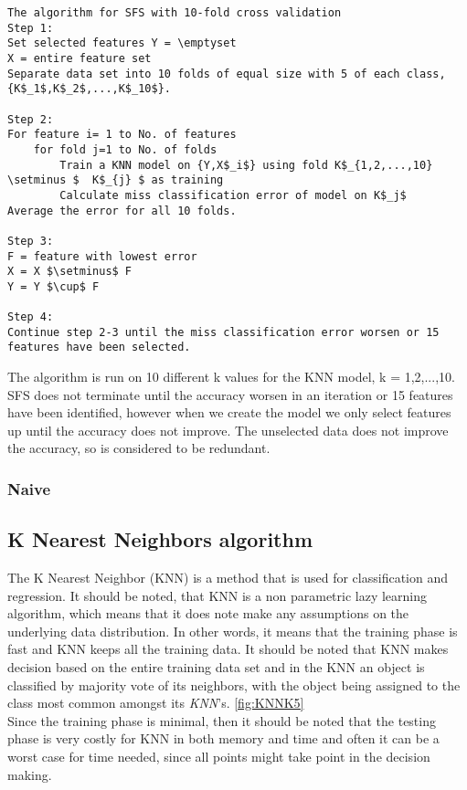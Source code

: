 \begin{lstlisting}[mathescape=true]
The algorithm for SFS with 10-fold cross validation
Step 1:
Set selected features Y = \emptyset
X = entire feature set
Separate data set into 10 folds of equal size with 5 of each class, {K$_1$,K$_2$,...,K$_10$}.

Step 2:
For feature i= 1 to No. of features
	for fold j=1 to No. of folds
		Train a KNN model on {Y,X$_i$} using fold K$_{1,2,...,10} \setminus $  K$_{j} $ as training
		Calculate miss classification error of model on K$_j$
Average the error for all 10 folds.

Step 3:
F = feature with lowest error
X = X $\setminus$ F
Y = Y $\cup$ F

Step 4:
Continue step 2-3 until the miss classification error worsen or 15 features have been selected.
\end{lstlisting}
The algorithm is run on 10 different k values for the KNN model, k = 1,2,...,10.
SFS does not terminate until the accuracy worsen in an iteration or 15 features have been identified, however when we create the model we only select features up until the accuracy does not improve. The unselected data does not improve the accuracy, so is considered to be redundant.


\subsubsection{Naive}


\subsection{K Nearest Neighbors algorithm}

The K Nearest Neighbor (KNN) is a method that is used for classification and regression. It should be noted, that KNN is a non parametric lazy learning algorithm, which means that it does note make any assumptions on the underlying data distribution. In other words, it means that the training phase is fast and KNN keeps all the training data. It should be noted that KNN makes decision based on the entire training data set and in the KNN an object is classified by majority vote of its neighbors, with the object being assigned to the class most common amongst its \textit{KNN}'s. \ref{fig:KNNK5}\\
Since the training phase is minimal, then it should be noted that the testing phase is very costly for KNN in both memory and time and often it can be a worst case for time needed, since all points might take point in the decision making. 

